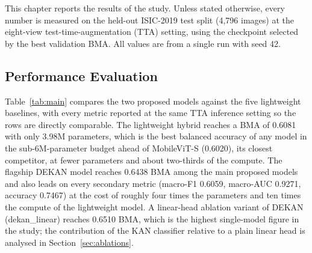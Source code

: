 This chapter reports the results of the study. Unless stated otherwise, every
number is measured on the held-out ISIC-2019 test split (4{,}796 images) at the
eight-view test-time-augmentation (TTA) setting, using the checkpoint selected by
the best validation BMA. All values are from a single run with seed 42.

\subsection{Performance Evaluation}

Table~\ref{tab:main} compares the two proposed models against the five
lightweight baselines, with every metric reported at the same TTA inference
setting so the rows are directly comparable. The lightweight hybrid reaches a BMA
of 0.6081 with only 3.98M parameters, which is the best balanced accuracy of any
model in the sub-6M-parameter budget ahead of MobileViT-S (0.6020), its
closest competitor, at fewer parameters and about two-thirds of the compute.
The flagship DEKAN model reaches 0.6438 BMA among the main proposed models and
also leads on every secondary metric (macro-F1 0.6059, macro-AUC 0.9271,
accuracy 0.7467) at the cost of roughly four times the parameters and ten times
the compute of the lightweight model. A linear-head ablation variant of DEKAN
(dekan\_linear) reaches 0.6510 BMA, which is the highest single-model figure in
the study; the contribution of the KAN classifier relative to a plain linear head
is analysed in Section~\ref{sec:ablations}.

\begin{table}[!t]
\centering
\caption{Main results on the ISIC-2019 test set (with 8-view TTA). Best value in
each column is in \textbf{bold}; the two proposed models are marked. A
linear-head ablation of DEKAN (dekan\_linear) reaches a higher BMA of 0.6510
but is reported with the other ablations in Section~\ref{subsec:ablation-study}
rather than here, so this table is not its intended place; the bold BMA marks
the best main model.}
\label{tab:main}
\end{table}

